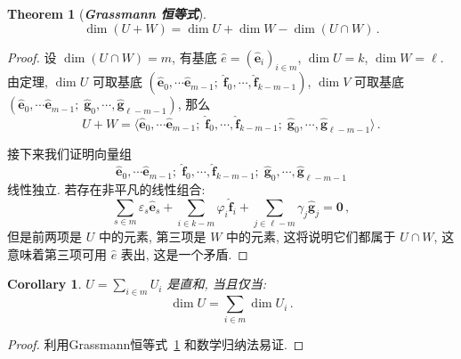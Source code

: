 \documentclass[openany]{ctexbook}
\newcommand*{\indexbf}[1]{\emph{\textbf{#1}}\index{#1}} %
\theoremstyle{plain}
\newtheorem{theorem}{Theorem}[section] %
\newtheorem{corollary}{Corollary} %
\theoremstyle{definition}
\newcommand*{\basis}[1]{\hat{\boldsymbol{#1}}} %
\newcommand*{\bv}{\boldsymbol} %
\begin{document}
\begin{theorem}[\indexbf{Grassmann 恒等式}]\label{Grassmann}
\begin{equation*}
	\dim (U + W) = \dim U + \dim W - \dim (U \cap W)\,.
\end{equation*}
\end{theorem}
\begin{proof}
	设 $\dim (U \cap W) = m$, 有基底 $\hat e = (\basis e_i)_{i \in m}$, $\dim U = k$, $\dim W = \ell$. 由定理, $\dim U$ 可取基底 $(\basis e_0, \cdots \basis e_{m-1};\; \basis f_0, \cdots, \basis f_{k - m - 1})$, $\dim V$ 可取基底 $(\basis e_0, \cdots \basis e_{m-1};\; \basis g_0, \cdots, \basis g_{\ell - m - 1})$, 那么
	\begin{equation*}
		U + W = \langle
			\basis e_0, \cdots \basis e_{m-1};\;
			\basis f_0, \cdots, \basis f_{k - m - 1};\;
			\basis g_0, \cdots, \basis g_{\ell - m - 1}
		\rangle\,.
	\end{equation*}

	接下来我们证明向量组
	\begin{equation*}
		\basis e_0, \cdots \basis e_{m-1};\;
		\basis f_0, \cdots, \basis f_{k - m - 1};\;
		\basis g_0, \cdots, \basis g_{\ell - m - 1}
	\end{equation*}
	线性独立. 若存在非平凡的线性组合:
	\begin{equation*}
		\sum_{s \in m} \varepsilon_s \basis e_s 
			+ \sum_{i \in k - m} \varphi_i \basis f_i
			+ \sum_{j \in \ell - m} \gamma_j \basis g_j
		= \bv 0\,,
	\end{equation*}
	但是前两项是 $U$ 中的元素, 第三项是 $W$ 中的元素, 这将说明它们都属于 $U \cap W$, 这意味着第三项可用 $\hat e$ 表出, 这是一个矛盾.
\end{proof}

\begin{corollary}
	$U = \sum_{i \in m} U_i$ 是直和, 当且仅当:
	\begin{equation*}
		\dim U = \sum_{i \in m} \dim U_i\,.
	\end{equation*}
\end{corollary}
\begin{proof}
	利用Grassmann恒等式~\ref{Grassmann} 和数学归纳法易证.
\end{proof}
\end{document}
